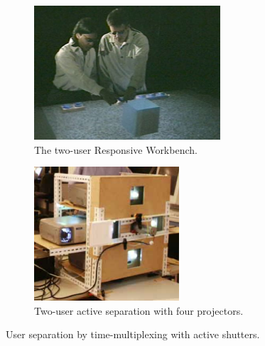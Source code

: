 \begin{figure}[htb]
  \begin{subfigure}{.5\textwidth}
    \centering
    \includegraphics[height=5cm]{figures/ch2/resp_workbench}
    \caption{The two-user Responsive Workbench.}
    \label{fig:2_sep_active:wb}
  \end{subfigure}
  \begin{subfigure}{.5\textwidth}
    \centering
    \includegraphics[height=5cm]{figures/ch2/four_proj}
    \caption{Two-user active separation with four projectors.}
    \label{fig:2_sep_active:four}
  \end{subfigure}
  \caption{\label{fig:2_sep_active}User separation by time-multiplexing with active shutters.}
\end{figure}

